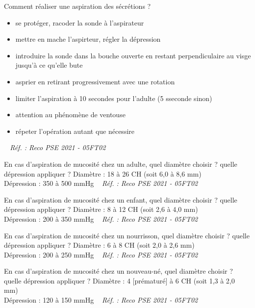 \documentclass[grid,avery5371,landscape]{flashcards}
\makeatletter
\newcounter{nocarte}
\newcommand{\categ}[1]{%
  \def\@categ{#1}%
  \setcounter{nocarte}{0}%
}
\newcommand{\source}[1]{%
  \medskip
  \itshape%
   ~ \hfill Réf. : #1}
\makeatother
\begin{document}
\color[HTML]{003273}
\categ{PSE}
\begin{flashcard}[geste]{
 Comment réaliser une aspiration des sécrétions ?   }
  \begin{itemize} 
\item se protéger, racoder la sonde à l'aspirateur 
\item mettre en mache l'aspirteur, régler la dépression 
\item introduire la sonde dans la bouche ouverte en restant perpendiculaire au visge jusqu'à ce qu'elle bute 
\item asprier en retirant progressivement avec une rotation 
\item limiter l'aspiration à 10 secondes pour l'adulte (5 sseconde sinon) 
\item attention au phénomène de ventouse 
 \item répeter l'opération autant que nécessire 
\end{itemize}
  \source{Reco PSE 2021 - 05FT02}
\end{flashcard}


\color[HTML]{003273}
\categ{PSE}
\begin{flashcard}[CAT]{
 En cas d'aspiration de mucosité chez un adulte, quel diamètre choisir ? quelle dépression appliquer ?   }
  Diamètre : 18 à 26 CH (soit 6,0 à 8,6 mm) \\
Dépression : 350 à 500 mmHg
  \source{Reco PSE 2021 - 05FT02}
\end{flashcard}


\color[HTML]{003273}
\categ{PSE}
\begin{flashcard}[CAT]{
 En cas d'aspiration de mucosité chez un enfant, quel diamètre choisir ? quelle dépression appliquer ?   }
  Diamètre : 8 à 12 CH (soit 2,6 à 4,0 mm) \\
Dépression : 200 à 350 mmHg
  \source{Reco PSE 2021 - 05FT02}
\end{flashcard}


\color[HTML]{003273}
\categ{PSE}
\begin{flashcard}[CAT]{
 En cas d'aspiration de mucosité chez un nourrisson, quel diamètre choisir ? quelle dépression appliquer ?   }
  Diamètre : 6 à 8 CH (soit 2,0 à 2,6 mm) \\
Dépression : 200 à 250 mmHg
  \source{Reco PSE 2021 - 05FT02}
\end{flashcard}


\color[HTML]{003273}
\categ{PSE}
\begin{flashcard}[CAT]{
 En cas d'aspiration de mucosité chez un nouveau-né, quel diamètre choisir ? quelle dépression appliquer ?   }
  Diamètre : 4 [prématuré] à 6 CH (soit 1,3 à 2,0 mm) \\
Dépression : 120 à 150 mmHg
  \source{Reco PSE 2021 - 05FT02}
\end{flashcard}
\end{document}
